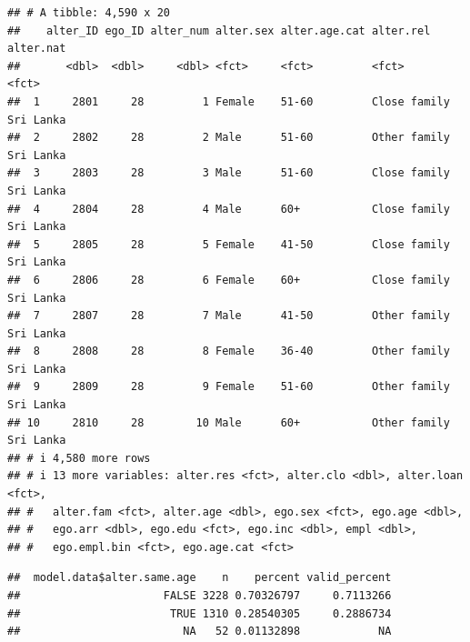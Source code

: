 \documentclass[
]{book}
\newenvironment{Shaded}{\begin{snugshade}}{\end{snugshade}}
\newcommand{\AttributeTok}[1]{\textcolor[rgb]{0.13,0.29,0.53}{#1}}
\newcommand{\CommentTok}[1]{\textcolor[rgb]{0.56,0.35,0.01}{\textit{#1}}}
\newcommand{\DocumentationTok}[1]{\textcolor[rgb]{0.56,0.35,0.01}{\textbf{\textit{#1}}}}
\newcommand{\FunctionTok}[1]{\textcolor[rgb]{0.13,0.29,0.53}{\textbf{#1}}}
\newcommand{\NormalTok}[1]{#1}
\newcommand{\OtherTok}[1]{\textcolor[rgb]{0.56,0.35,0.01}{#1}}
\newcommand{\SpecialCharTok}[1]{\textcolor[rgb]{0.81,0.36,0.00}{\textbf{#1}}}
\begin{document}
\begin{verbatim}
## # A tibble: 4,590 x 20
##    alter_ID ego_ID alter_num alter.sex alter.age.cat alter.rel    alter.nat
##       <dbl>  <dbl>     <dbl> <fct>     <fct>         <fct>        <fct>    
##  1     2801     28         1 Female    51-60         Close family Sri Lanka
##  2     2802     28         2 Male      51-60         Other family Sri Lanka
##  3     2803     28         3 Male      51-60         Close family Sri Lanka
##  4     2804     28         4 Male      60+           Close family Sri Lanka
##  5     2805     28         5 Female    41-50         Close family Sri Lanka
##  6     2806     28         6 Female    60+           Close family Sri Lanka
##  7     2807     28         7 Male      41-50         Other family Sri Lanka
##  8     2808     28         8 Female    36-40         Other family Sri Lanka
##  9     2809     28         9 Female    51-60         Other family Sri Lanka
## 10     2810     28        10 Male      60+           Other family Sri Lanka
## # i 4,580 more rows
## # i 13 more variables: alter.res <fct>, alter.clo <dbl>, alter.loan <fct>,
## #   alter.fam <fct>, alter.age <dbl>, ego.sex <fct>, ego.age <dbl>,
## #   ego.arr <dbl>, ego.edu <fct>, ego.inc <dbl>, empl <dbl>,
## #   ego.empl.bin <fct>, ego.age.cat <fct>
\end{verbatim}

\begin{Shaded}
\end{Shaded}

\begin{verbatim}
##  model.data$alter.same.age    n    percent valid_percent
##                      FALSE 3228 0.70326797     0.7113266
##                       TRUE 1310 0.28540305     0.2886734
##                         NA   52 0.01132898            NA
\end{verbatim}
\end{document}
